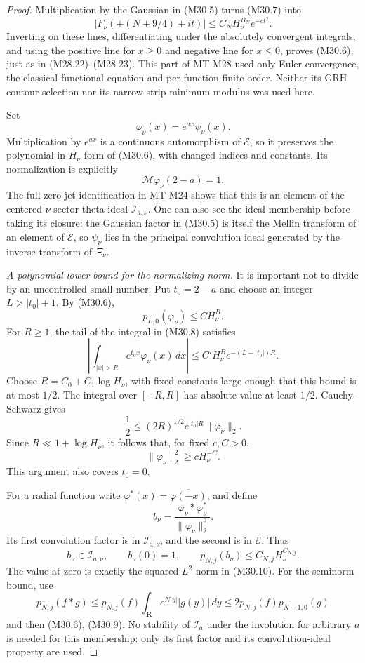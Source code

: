 \begin{proof}
Multiplication by the Gaussian in (M30.5)
turns (M30.7) into
\[
 |F_\nu(\pm(N+9/4)+it)|
                 \le C_NH_\nu^{B_N}e^{-c t^2}.
 \]
Inverting on these lines, differentiating
under the absolutely convergent integrals,
and using the positive line for \(x\ge0\)
and negative line for \(x\le0\), proves
(M30.6), just as in (M28.22)--(M28.23).
This part of MT-M28 used only Euler
convergence, the classical functional
equation and per-function finite order.
Neither its GRH contour selection nor
its narrow-strip minimum modulus was
used here.

Set
\[
                 \varphi_\nu(x)=e^{ax}\psi_\nu(x).
 \]
Multiplication by \(e^{ax}\) is a continuous
automorphism of \(\mathcal E\), so it
preserves the polynomial-in-\(H_\nu\)
form of (M30.6), with changed indices
and constants. Its normalization is
explicitly
\[
                   \mathcal M\varphi_\nu(2-a)=1.              \tag{M30.8}
\]
The full-zero-jet identification in
MT-M24 shows that this is an element
of the centered \(\nu\)-sector
theta ideal \(\mathcal I_{a,\nu}\).
One can also see the ideal membership
before taking its closure: the
Gaussian factor in (M30.5) is itself
the Mellin transform of an element
of \(\mathcal E\), so \(\psi_\nu\)
lies in the principal convolution
ideal generated by the inverse
transform of \(\Xi_\nu\).

\emph{A polynomial lower bound for the normalizing norm.}
It is important not to divide by an
uncontrolled small number. Put \(t_0=2-a\)
and choose an integer \(L>|t_0|+1\).
By (M30.6),
\[
                  p_{L,0}(\varphi_\nu)\le C H_\nu^B.
 \]
For \(R\ge1\), the tail of the integral
in (M30.8) satisfies
\[
 \left|\int_{|x|>R}e^{t_0x}\varphi_\nu(x)\,dx\right|
       \le C' H_\nu^B e^{-(L-|t_0|)R}.
 \]
Choose \(R=C_0+C_1\log H_\nu\), with
fixed constants large enough that
this bound is at most \(1/2\).
The integral over \([-R,R]\) has
absolute value at least \(1/2\).
Cauchy--Schwarz gives
\[
 \frac12\le
       (2R)^{1/2}e^{|t_0|R}\|\varphi_\nu\|_2 .
 \]
Since \(R\ll1+\log H_\nu\), it follows
that, for fixed \(c,C>0\),
\[
                   \|\varphi_\nu\|_2^2\ge cH_\nu^{-C}.        \tag{M30.9}
\]
This argument also covers \(t_0=0\).

For a radial function write
\(\varphi^*(x)=\overline{\varphi(-x)}\), and define
\[
              b_\nu
                =\frac{\varphi_\nu*\varphi_\nu^*}
                             {\|\varphi_\nu\|_2^2}.           \tag{M30.10}
\]
Its first convolution factor is in
\(\mathcal I_{a,\nu}\), and the second
is in \(\mathcal E\). Thus
\[
          b_\nu\in\mathcal I_{a,\nu},
          \qquad b_\nu(0)=1,\qquad
          p_{N,j}(b_\nu)\le C_{N,j}H_\nu^{C_{N,j}}.            \tag{M30.11}
\]
The value at zero is exactly the
squared \(L^2\) norm in (M30.10).
For the seminorm bound, use
\[
 p_{N,j}(f*g)
   \le p_{N,j}(f)\int_{\mathbf R}e^{N|y|}|g(y)|\,dy
   \le 2p_{N,j}(f)p_{N+1,0}(g)
 \]
and then (M30.6), (M30.9).
No stability of \(\mathcal I_a\)
under the involution for arbitrary
\(a\) is needed for this membership:
only its first factor and its
convolution-ideal property are used.


\end{proof}
